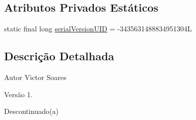 \subsection*{Atributos Privados Estáticos}
\begin{DoxyCompactItemize}
\item 
static final long \hyperlink{classusina_1_1_d_a_o_1_1turbina_1_1_turbina_transfer_af045072d2dcbfdf01eef572cf62ba9e3}{serial\-Version\-U\-I\-D} = -\/3435631488834951304\-L
\end{DoxyCompactItemize}


\subsection{Descrição Detalhada}
\begin{DoxyAuthor}{Autor}
Victor Soares 
\end{DoxyAuthor}
\begin{DoxyVersion}{Versão}
1.
\end{DoxyVersion}
\begin{DoxyRefDesc}{Descontinuado(a)}
\item[\hyperlink{deprecated__deprecated000005}{Descontinuado(a)}]\end{DoxyRefDesc}


